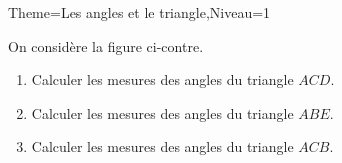 \documentclass[a4paper,12pt]{article}
\begin{document}
\begin{Maquette}[Fiche]{Theme=Les angles et le triangle,Niveau=1}
\begin{exercice}
\begin{minipage}{0.6\linewidth}
On considère la figure ci-contre.
\begin{enumerate}
\item Calculer les mesures des angles du triangle $ACD$.
\item Calculer les mesures des angles du triangle $ABE$.
\item Calculer les mesures des angles du triangle $ACB$.
\end{enumerate}
\end{minipage}\hfill%
\begin{minipage}{0.4\linewidth}
\end{minipage}
\end{exercice}




\end{Maquette}
\end{document}
